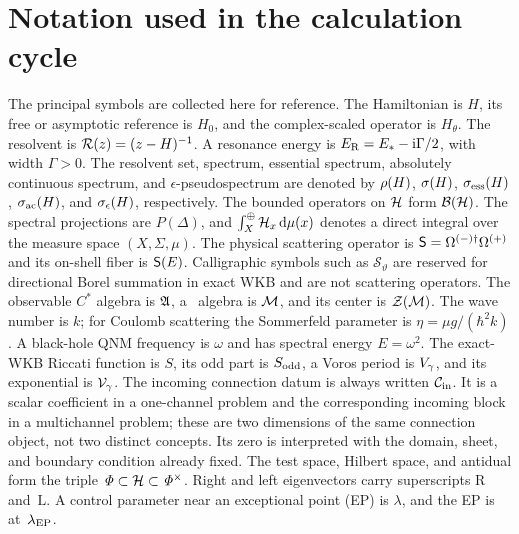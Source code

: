 \section{Notation used in the calculation cycle}
\label{app:notation}

The principal symbols are collected here for reference.  The Hamiltonian is
$H$, its free or asymptotic reference is $H_0$, and the complex-scaled operator
is $H_\theta$.  The resolvent is $\mathcal{R}(z)=(z-H)^{-1}$.  A resonance
energy is $E_{\mathrm{R}}=E_*-\mathrm{i}\Gamma/2$, with width $\Gamma>0$.  The
resolvent set, spectrum, essential spectrum, absolutely continuous spectrum,
and $\epsilon$-pseudospectrum are denoted by $\rho(H)$,
$\sigma(H)$, $\sigma_{\mathrm{ess}}(H)$, $\sigma_{\mathrm{ac}}(H)$, and
$\sigma_\epsilon(H)$, respectively.  The bounded operators on $\mathcal{H}$ form
$\mathcal{B}(\mathcal{H})$.  The spectral projections are $P(\Delta)$, and
$\int_X^\oplus\mathcal{H}_x\,\mathrm{d}\mu(x)$ denotes a direct integral over the measure
space $(X,\Sigma,\mu)$.  The physical scattering operator is
$\mathsf{S}=\Omega^{(-)\dagger}\Omega^{(+)}$ and its on-shell fiber is
$\mathsf{S}(E)$.  Calligraphic symbols such as $\mathcal S_\vartheta$ are
reserved for directional Borel summation in exact WKB and are not scattering
operators.  The observable $C^*$ algebra is $\mathfrak{A}$, a \vN\
algebra is $\mathcal{M}$, and its center is $\mathcal{Z}(\mathcal{M})$.  The wave number is
$k$; for Coulomb scattering the Sommerfeld parameter is
$\eta=\mu g/(\hbar^2k)$.  A black-hole QNM frequency is $\omega$ and has
spectral energy $E=\omega^2$.  The exact-WKB Riccati function is $S$, its odd
part is $S_{\mathrm{odd}}$, a Voros period is $V_\gamma$, and its exponential
is $\mathcal{V}_\gamma$.  The incoming connection datum is always written
$\mathcal{C}_{\mathrm{in}}$.  It is a scalar coefficient in a one-channel problem and the
corresponding incoming block in a multichannel problem; these are two
dimensions of the same connection object, not two distinct concepts.  Its
zero is interpreted with the domain, sheet, and boundary condition already
fixed.  The test space, Hilbert space, and antidual form the
triple $\mathit{\Phi}\subset\mathcal{H}\subset\mathit{\Phi}^\times$.  Right and left
eigenvectors carry superscripts $\mathrm R$ and~$\mathrm L$.  A control
parameter near an exceptional point (EP) is $\lambda$, and the EP is at~$\lambda_{\mathrm{EP}}$.

\clearpage
